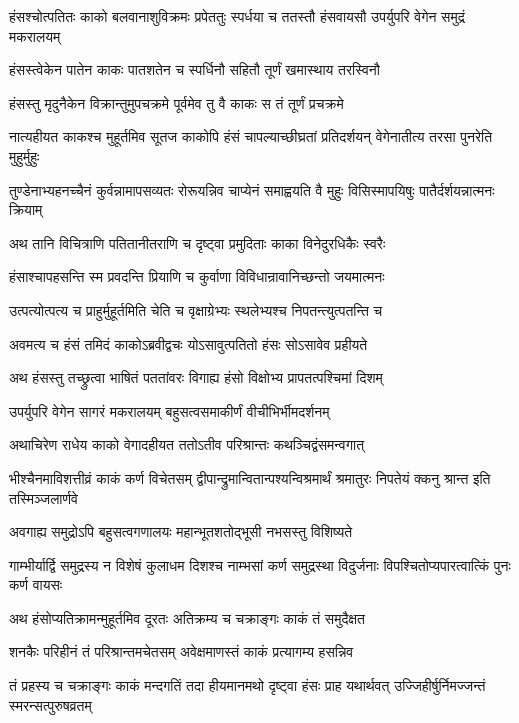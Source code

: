 \threelineshloka
{हंसश्चोत्पतितः काको बलवानाशुविक्रमः}
{प्रपेततुः स्पर्धया च ततस्तौ हंसवायसौ}
{उपर्युपरि वेगेन समुद्रं मकरालयम्}


\twolineshloka
{हंसस्त्वेकेन पातेन काकः पातशतेन च}
{स्पर्धिनौ सहितौ तूर्णं खमास्थाय तरस्विनौ}


\twolineshloka
{हंसस्तु मृदुनैकेन विक्रान्तुमुपचक्रमे}
{पूर्वमेव तु वै काकः स तं तूर्णं प्रचक्रमे}


नात्यहीयत काकश्च मुहूर्तमिव सूतज
\twolineshloka
{काकोपि हंसं चापल्याच्छीघ्रतां प्रतिदर्शयन्}
{वेगेनातीत्य तरसा पुनरेति मुहुर्मुहुः}


\threelineshloka
{तुण्डेनाभ्यहनच्चैनं कुर्वन्नामापसव्यतः}
{रोरूयन्निव चाप्येनं समाह्वयति वै मुहुः}
{विसिस्मापयिषुः पातैर्दर्शयन्नात्मनः क्रियाम्}


\twolineshloka
{अथ तानि विचित्राणि पतितानीतराणि च}
{दृष्ट्वा प्रमुदिताः काका विनेदुरधिकैः स्वरैः}


\twolineshloka
{हंसाश्चापहसन्ति स्म प्रवदन्ति प्रियाणि च}
{कुर्वाणा विविधान्रावानिच्छन्तो जयमात्मनः}


\twolineshloka
{उत्पत्योत्पत्य च प्राहुर्मुहूर्तमिति चेति च}
{वृक्षाग्रेभ्यः स्थलेभ्यश्च निपतन्त्युत्पतन्ति च}


\twolineshloka
{अवमत्य च हंसं तमिदं काकोऽब्रवीद्वचः}
{योऽसावुत्पतितो हंसः सोऽसावेव प्रहीयते}


\twolineshloka
{अथ हंसस्तु तच्छ्रुत्वा भाषितं पततांवरः}
{विगाह्य हंसो विक्षोभ्य प्रापतत्पश्चिमां दिशम्}


\twolineshloka
{उपर्युपरि वेगेन सागरं मकरालयम्}
{बहुसत्वसमाकीर्णं वीचीभिर्भीमदर्शनम्}


\twolineshloka
{अथाचिरेण राधेय काको वेगादहीयत}
{ततोऽतीव परिश्रान्तः कथञ्चिद्वंसमन्वगात्}


\threelineshloka
{भीश्चैनमाविशत्तीव्रं काकं कर्ण विचेतसम्}
{द्वीपान्द्रुमान्वितान्पश्यन्विश्रमार्थं श्रमातुरः}
{निपतेयं क्कनु श्रान्त इति तस्मिञ्जलार्णवे}


\twolineshloka
{अवगाह्य समुद्रोऽपि बहुसत्वगणालयः}
{महान्भूतशतोद्भूसी नभसस्तु विशिष्यते}


\threelineshloka
{गाम्भीर्यार्द्वि समुद्रस्य न विशेषं कुलाधम}
{दिशश्च नाम्भसां कर्ण समुद्रस्था विदुर्जनाः}
{विपश्चितोप्यपारत्वात्किं पुनः कर्ण वायसः}


\twolineshloka
{अथ हंसोप्यतिक्रामन्मुहूर्तमिव दूरतः}
{अतिक्रम्य च चक्राङ्गः काकं तं समुदैक्षत}


\twolineshloka
{शनकैः परिहीनं तं परिश्रान्तमचेतसम्}
{अवेक्षमाणस्तं काकं प्रत्यागम्य हसन्निव}


\threelineshloka
{तं प्रहस्य च चक्राङ्गः काकं मन्दगतिं तदा}
{हीयमानमथो दृष्ट्वा हंसः प्राह यथार्थवत्}
{उज्जिहीर्षुर्निमज्जन्तं स्मरन्सत्पुरुषव्रतम्}


